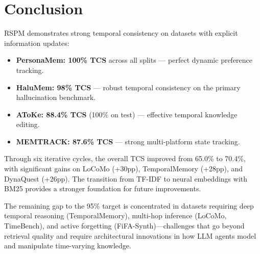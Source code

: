 \documentclass[11pt,a4paper]{article}
\begin{document}
\section{Conclusion}
\label{sec:conclusion}

RSPM demonstrates strong temporal consistency on datasets with explicit
information updates:
\begin{itemize}[nosep]
    \item \textbf{PersonaMem: 100\% TCS} across all splits --- perfect
          dynamic preference tracking.
    \item \textbf{HaluMem: 98\% TCS} --- robust temporal consistency
          on the primary hallucination benchmark.
    \item \textbf{AToKe: 88.4\% TCS} (100\% on test) --- effective
          temporal knowledge editing.
    \item \textbf{MEMTRACK: 87.6\% TCS} --- strong multi-platform state tracking.
\end{itemize}

Through six iterative cycles, the overall TCS improved from 65.0\% to
70.4\%, with significant gains on LoCoMo (+30pp), TemporalMemory (+28pp),
and DynaQuest (+26pp).  The transition from TF-IDF to neural embeddings
with BM25 provides a stronger foundation for future improvements.

The remaining gap to the 95\% target is concentrated in datasets requiring
deep temporal reasoning (TemporalMemory), multi-hop inference (LoCoMo,
TimeBench), and active forgetting (FiFA-Synth)---challenges that go beyond
retrieval quality and require architectural innovations in how LLM agents
model and manipulate time-varying knowledge.
\end{document}
